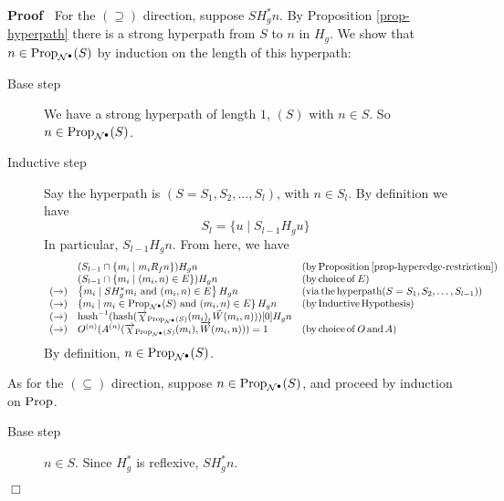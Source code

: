 \documentclass{article}
\newcommand{\infixand}{\text{ and }}
\newcommand{\tmop}[1]{\ensuremath{\operatorname{#1}}}
\newenvironment{proof}{\noindent\textbf{Proof\ }}{\hspace*{\fill}$\Box$\medskip}
\newcommand{\Net}{\ensuremath{\mathcal{N}}}
\newcommand{\bigchi}{\Large{\chi}}
\newcommand{\hash}{\textsf{\tmop{hash}}}
\newcommand{\Prop}{\textsf{\tmop{Prop}}}
\begin{document}
\begin{proof}
  For the $(\supseteq)$ direction, suppose $S H^{\ast}_g n$. By Proposition
  \ref{prop-hyperpath} there is a strong hyperpath from $S$ to $n$ in $H_g$.
  We show that $n \in \Prop_{\Net^{\bullet}} (S)$ by induction on the length
  of this hyperpath:
  \begin{description}
    \item[Base step] We have a strong hyperpath of length $1$, $(S)$ with $n
    \in S$. So $n \in \Prop_{\Net^{\bullet}} (S)$.
    
    \item[Inductive step] Say the hyperpath is $(S = S_1, S_2, \ldots, S_l)$,
    with $n \in S_l$. By definition we have
    \[ S_l = \{ u \mid S_{l - 1} H _g u \} \]
    In particular, $S_{l - 1} H_g n$. From here, we have
    \[ \begin{array}{lll}
         & (S_{l - 1} \cap \{ m_i \mid m_i R_f n \}) H_g n & \left( \tmop{by}
         \tmop{Proposition} \ref{prop-hyperedge-restriction} \right)\\
         & (S_{l - 1} \cap \{ m_i \mid (m_i, n) \in E \}) H_g n & (\tmop{by}
         \tmop{choice} \tmop{of} E)\\
         (\rightarrow) & \left\{ m_i \mid S H^{\ast}_g m_i \infixand (m_i, n)
         \in E \right\} H_g n & (\tmop{via} \tmop{the} \tmop{hyperpath} (S =
         S_1, S_2, \ldots, S_{l - 1}))\\
         (\rightarrow) & \left\{ m_i \mid m_i \in \Prop_{\Net^{\bullet}} (S)
         \infixand (m_i, n) \in E \right\} H_g n & (\tmop{by} \tmop{Inductive}
         \tmop{Hypothesis})\\
         (\rightarrow) & \hash^{- 1} (\hash
         (\smash{\overrightarrow{\bigchi}}_{\Prop_{\Net^{\bullet}} (S)} (m_i),
         \smash{\vec{W}} (m_i, n))) [0] H_g n & \\
         (\rightarrow) & O^{(n)} (A^{(n)}
         (\smash{\overrightarrow{\bigchi}}_{\Prop_{\Net^{\bullet}} (S)} (m_i),
         \smash{\overrightarrow{W}} (m_i, n))) = 1 & (\tmop{by} \tmop{choice}
         \tmop{of} O \tmop{and} A)
       \end{array} \]
    By definition, $n \in \Prop_{\Net^{\bullet}} (S)$.
  \end{description}
  As for the $(\subseteq)$ direction, suppose $n \in \Prop_{\Net^{\bullet}}
  (S)$, and proceed by induction on $\Prop$.
  \begin{description}
    \item[Base step] $n \in S$. Since $H^{\ast}_g$ is reflexive, $S H^{\ast}_g
    n$.
    

\end{description}
\end{proof}
\end{document}
